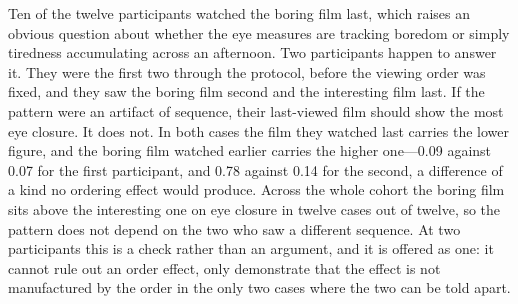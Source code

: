 %
%

Ten of the twelve participants watched the boring film last, which raises an obvious question
about whether the eye measures are tracking boredom or simply tiredness accumulating across an
afternoon. Two participants happen to answer it. They were the first two through the protocol,
before the viewing order was fixed, and they saw the boring film second and the interesting
film last. If the pattern were an artifact of sequence, their last-viewed film should show the
most eye closure. It does not. In both cases the film they watched last carries the lower
figure, and the boring film watched earlier carries the higher one---0.09 against 0.07 for the
first participant, and 0.78 against 0.14 for the second, a difference of a kind no ordering
effect would produce. Across the whole cohort the boring film sits above the interesting one on
eye closure in twelve cases out of twelve, so the pattern does not depend on the two who saw a
different sequence. At two participants this is a check rather than an argument, and it is
offered as one: it cannot rule out an order effect, only demonstrate that the effect is not
manufactured by the order in the only two cases where the two can be told apart.


